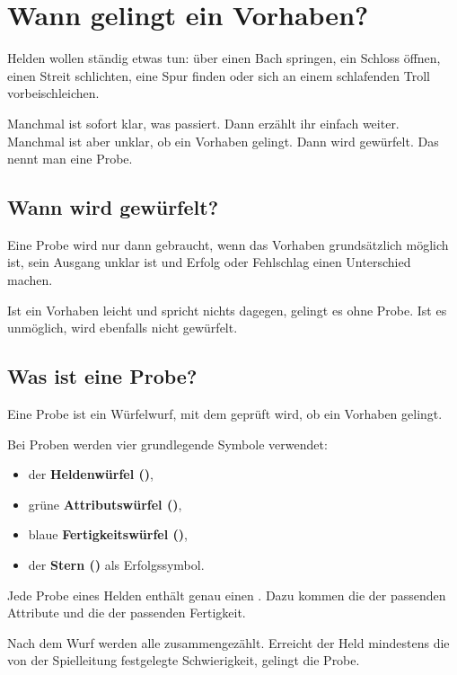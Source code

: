 \chapter{Wann gelingt ein Vorhaben?}

Helden wollen ständig etwas tun: über einen Bach springen, ein Schloss öffnen, einen Streit schlichten, eine Spur finden oder sich an einem schlafenden Troll vorbeischleichen.

Manchmal ist sofort klar, was passiert. Dann erzählt ihr einfach weiter. Manchmal ist aber unklar, ob ein Vorhaben gelingt. Dann wird gewürfelt. Das nennt man eine Probe.

\section{Wann wird gewürfelt?}

Eine Probe wird nur dann gebraucht, wenn das Vorhaben grundsätzlich möglich ist, sein Ausgang unklar ist und Erfolg oder Fehlschlag einen Unterschied machen.

Ist ein Vorhaben leicht und spricht nichts dagegen, gelingt es ohne Probe. Ist es unmöglich, wird ebenfalls nicht gewürfelt.

\section{Was ist eine Probe?}

Eine Probe ist ein Würfelwurf, mit dem geprüft wird, ob ein Vorhaben gelingt.

Bei Proben werden vier grundlegende Symbole verwendet:

\begin{itemize}
  \item der \textbf{Heldenwürfel (\heroDie)},
  \item grüne \textbf{Attributswürfel (\greenDie)},
  \item blaue \textbf{Fertigkeitswürfel (\blueDie)},
  \item der \textbf{Stern (\star)} als Erfolgssymbol.
\end{itemize}

Jede Probe eines Helden enthält genau einen \heroDie. Dazu kommen die \greenDie{} der passenden Attribute und die \blueDie{} der passenden Fertigkeit.

Nach dem Wurf werden alle \star{} zusammengezählt. Erreicht der Held mindestens die von der Spielleitung festgelegte Schwierigkeit, gelingt die Probe.

